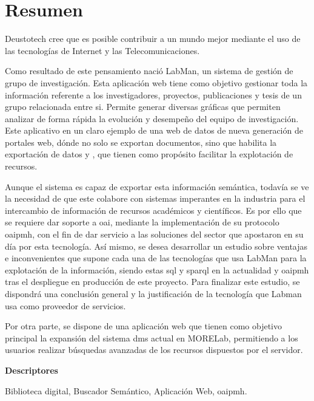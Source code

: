 \chapter*{Resumen}

Deustotech cree que es posible contribuir a un mundo mejor mediante el uso de
las tecnologías de Internet y las Telecomunicaciones.

Como resultado de este pensamiento nació LabMan, un sistema de gestión de grupo de investigación. Esta aplicación web tiene como objetivo gestionar toda la información referente a los investigadores, proyectos, publicaciones y tesis de un grupo relacionada entre si. Permite 
generar diversas gráficas que permiten analizar de forma rápida la evolución y desempeño del equipo
de investigación.
Este aplicativo en un claro ejemplo de una web de datos de nueva generación de portales web, dónde
no solo se exportan documentos, sino que habilita la exportación de datos y , que
tienen como propósito facilitar la explotación de recursos.

Aunque el sistema es capaz de exportar esta información semántica, todavía se ve la necesidad de que este colabore con sistemas imperantes en la industria para el intercambio de información de recursos académicos y científicos.
Es por ello que se requiere dar soporte a \acrshort{oai}, mediante la implementación de su protocolo \acrshort{oaipmh}, con el fin de dar servicio a las soluciones del sector que apostaron en su día por esta tecnología. Así mismo, se desea desarrollar un estudio sobre ventajas e inconvenientes que supone cada una de las tecnologías que usa LabMan para la explotación de la información, siendo estas \acrshort{sql} y \acrshort{sparql} en la actualidad y \acrshort{oaipmh} tras el despliegue en producción de este proyecto. Para finalizar este estudio, se dispondrá una conclusión general y la justificación de la tecnología que Labman usa como proveedor de servicios.

Por otra parte, se dispone de una aplicación web que tienen como objetivo principal la expansión
del sistema \acrshort{dms} actual en MORELab, permitiendo a los usuarios realizar búsquedas avanzadas de los recursos dispuestos por el servidor.

\vspace{2em}

{\Large\bfseries\sffamily Descriptores}
\vspace{3\medskipamount}

Biblioteca digital, Buscador Semántico, Aplicación Web, \acrshort{oaipmh}.